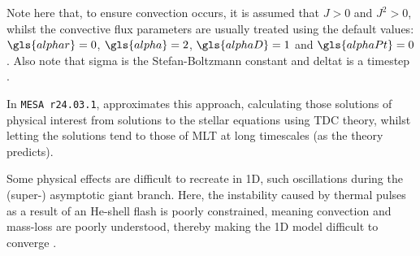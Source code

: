 Note here that, to ensure convection occurs, it is assumed that $J>0$ and $J^2>0$, whilst the convective flux parameters are usually treated using the default values: $\gls{alphar}=0$, $\gls{alpha} = 2$, $\gls{alphaD} = 1$ and $\gls{alphaPt}=0$. Also note that \gls{sigma} is the Stefan-Boltzmann constant and \gls{deltat} is a timestep \citep{Jermyn23}.

In \texttt{MESA r24.03.1}, \citet{Jermyn23} approximates this approach, calculating those solutions of physical interest from solutions to the stellar equations using \gls{TDC} theory, whilst letting the solutions tend to those of \gls{MLT} at long timescales (as the theory predicts). 

Some physical effects are difficult to recreate in 1D, such oscillations during the (super-) asymptotic giant branch. Here, the instability caused by thermal pulses as a result of an He-shell flash is poorly constrained, meaning convection and mass-loss are poorly understood, thereby making the 1D model difficult to converge \citep{Rees24}. 